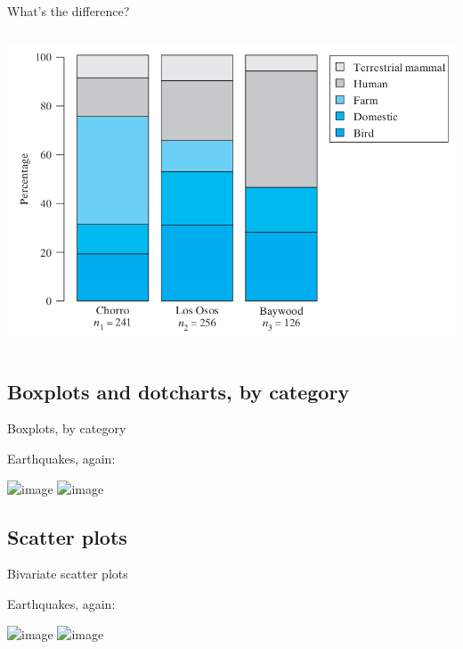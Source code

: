 \begin{frame}{What's the difference?}
\begin{columns}
\begin{column}{0.5\textwidth}
\begin{center}
            \includegraphics[width=.9\textwidth]{ecoli-freqs-fig2_5_2.png}
    \end{center}
\end{column}
\end{columns}

\end{frame}


\subsection{Boxplots and dotcharts, by category}

\begin{frame}{Boxplots, by category}

    Earthquakes, again:
    \begin{center}
        \includegraphics<1>[width=\textwidth]{quakes-category-dotplot}
        \includegraphics<2>[width=\textwidth]{quakes-category-boxplot}
    \end{center}

\end{frame}


\subsection{Scatter plots}

\begin{frame}{Bivariate scatter plots}

  Earthquakes, again:
  \begin{center}
    \includegraphics<1>{quakes-mag-depth}
    \includegraphics<2>{quakes-mag-depth-lines}
  \end{center}


\end{frame}


